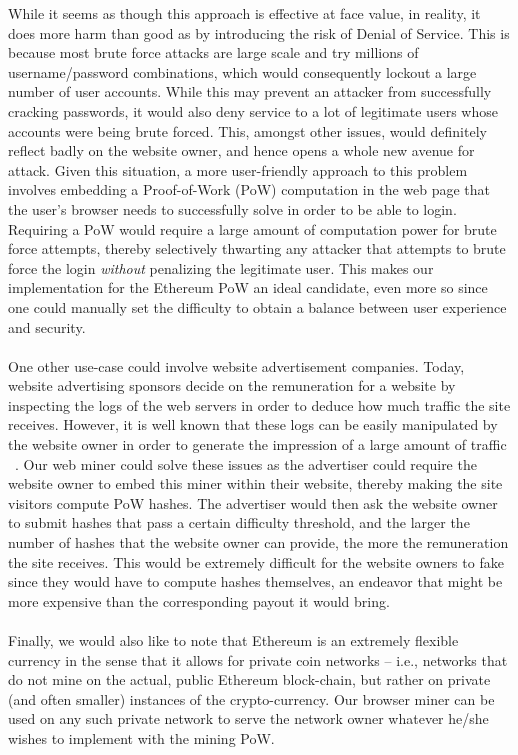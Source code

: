 \documentclass[runningheads]{llncs}
\begin{document}
While it seems as though this approach is effective at face value, in reality, it does more harm than good as by introducing the risk of Denial of Service. This is because most brute force attacks are large scale and try millions of username/password combinations, which would consequently lockout a large number of user accounts. While this may prevent an attacker from successfully cracking passwords, it would also deny service to a lot of legitimate users whose accounts were being brute forced. This, amongst other issues, would definitely reflect badly on the website owner, and hence opens a whole new avenue for attack.   
Given this situation, a more user-friendly approach to this problem involves embedding a Proof-of-Work (PoW) computation in the web page that the user's browser needs to successfully solve in order to be able to login. Requiring a PoW would require a large amount of computation power for brute force attempts, thereby selectively thwarting any attacker that attempts to brute force the login \emph{without} penalizing the legitimate user. This makes our implementation for the Ethereum PoW an ideal candidate, even more so since one could manually set the difficulty to obtain a balance between user experience and security. \\ \\
One other use-case could involve website advertisement companies. Today, website advertising sponsors decide on the remuneration for a website by inspecting the logs of the web servers in order to deduce how much traffic the site receives. However, it is well known that these logs can be easily manipulated by the website owner in order to generate the impression of a large amount of traffic ~\cite{webLogsManipulation}. Our web miner could solve these issues as the advertiser could require the website owner to embed this miner within their website, thereby making the site visitors compute PoW hashes. The advertiser would then ask the website owner to submit hashes that pass a certain difficulty threshold, and the larger the number of hashes that the website owner can provide, the more the remuneration the site receives. This would be extremely difficult for the website owners to fake since they would have to compute hashes themselves, an endeavor that might be more expensive than the corresponding payout it would bring.\\ \\
Finally, we would also like to note that Ethereum is an extremely flexible currency in the sense that it allows for private coin networks -- i.e., networks that do not mine on the actual, public Ethereum block-chain, but rather on private (and often smaller) instances of the crypto-currency. Our browser miner can be used on any such private network to serve the network owner whatever he/she wishes to implement with the mining PoW.
\end{document}
